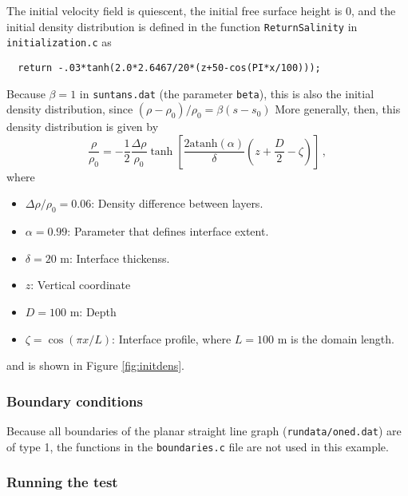 The initial velocity field is quiescent, the initial free surface height is 0,
and the initial density distribution is defined in the function \verb+ReturnSalinity+
in \verb+initialization.c+ as
\begin{verbatim}
  return -.03*tanh(2.0*2.6467/20*(z+50-cos(PI*x/100)));
\end{verbatim}
Because $\beta=1$ in \verb+suntans.dat+ (the parameter \verb+beta+), this is also the initial density 
distribution, since $(\rho-\rho_0)/\rho_0 = \beta(s-s_0)$ More generally, then, 
this density distribution is given by
\[
\frac{\rho}{\rho_0} = -\frac{1}{2}\frac{\Delta\rho}{\rho_0}
\tanh\left[\frac{2\mbox{atanh}(\alpha)}{\delta}\left(z+\frac{D}{2}-\zeta\right)\right]\,,
\]
where
\begin{itemize}
\item $\Delta\rho/\rho_0=0.06$: Density difference between layers.
\item $\alpha=0.99$: Parameter that defines interface extent.
\item $\delta=20$ m: Interface thickenss.
\item $z$: Vertical coordinate
\item $D=100$ m: Depth
\item $\zeta = \cos(\pi x/L)$: Interface profile, where $L=100$ m is the domain length.
\end{itemize}
and is shown in Figure \ref{fig:initdens}. 

\subsubsection{Boundary conditions}

Because all boundaries of the planar
straight line graph (\verb+rundata/oned.dat+) are of type 1, the functions in the \verb+boundaries.c+ file are
not used in this example.

\subsubsection{Running the test}

